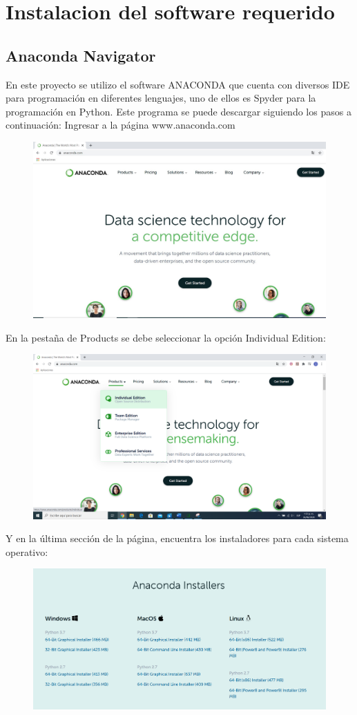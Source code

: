 \documentclass[letterpaper,12pt]{article}
\begin{document}
	\section{Instalacion del software requerido}
	\subsection{Anaconda Navigator}
	En este proyecto se utilizo el software ANACONDA que cuenta con diversos IDE para programación en diferentes lenguajes, uno de ellos es Spyder para la programación en Python. Este programa se puede descargar siguiendo los pasos a continuación:
	Ingresar a la página www.anaconda.com 
	\begin{figure}[H]
		\centering
		\includegraphics[width=0.7\linewidth]{images/Anaconda1}
		\label{fig:anaconda1}
	\end{figure}
	
	En la pestaña de Products se debe seleccionar la opción Individual Edition:
	\begin{figure}[H]
		\centering
		\includegraphics[width=0.7\linewidth]{images/anaconda2}
		\label{fig:anaconda2}
	\end{figure}
	
	Y en la última sección de la página, encuentra los instaladores para cada sistema operativo:
	\begin{figure}[H]
		\centering
		\includegraphics[width=0.7\linewidth]{images/anaconda3}
		\label{fig:anaconda3}
	\end{figure}
	
\end{document}
